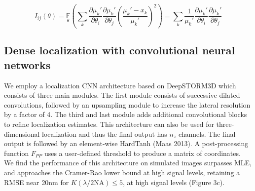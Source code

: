 \documentclass{ucetd}
\begin{document}
\begin{equation*}
I_{ij}(\theta) = \underset{\theta}{\mathbb{E}}\left(\sum_{k}\frac{\partial \mu_{k}'}{\partial\theta_{i}}\frac{\partial \mu_{k}'}{\partial\theta_{j}} \left(\frac{\mu_{k}'-x_{k}}{\mu_{k}'}\right)^{2}\right) = \sum_{k}\frac{1}{\mu_{k}'}\frac{\partial \mu_{k}'}{\partial\theta_{i}}\frac{\partial \mu_{k}'}{\partial\theta_{j}}
\end{equation*}

\subsection{Dense localization with convolutional neural networks}

We employ a localization CNN architecture based on DeepSTORM3D which consists of three main modules. The first module consists of successive dilated convolutions, followed by an upsampling module to increase the lateral resolution by a factor of 4. The third and last module adds additional convolutional blocks to refine localization estimates. This architecture can also be used for three-dimensional localization and thus the final output has $n_{z}$ channels. The final output is followed by an element-wise HardTanh (Maas 2013). A post-processing function $F_{PP}$ uses a user-defined threshold to produce a matrix of coordinates. We find the performance of this architecture on simulated images surpasses MLE, and approaches the Cramer-Rao lower bound at high signal levels, retaining a RMSE near 20nm for $K(\lambda/2\mathrm{NA}) \leq 5$, at high signal levels (Figure 3c). 

\end{document}
